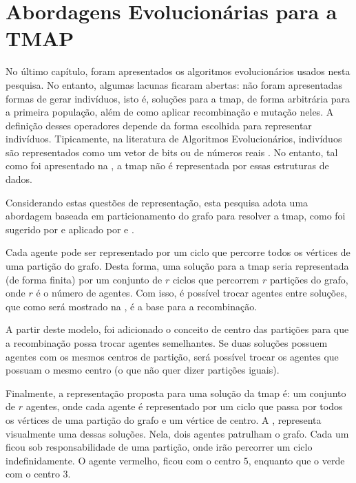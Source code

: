 \chapter{Abordagens Evolucionárias para a TMAP}
\label{chp:abordagens}

No último capítulo, foram apresentados os algoritmos evolucionários usados nesta 
pesquisa. No entanto, algumas lacunas ficaram abertas: não foram apresentadas 
formas de gerar indivíduos, isto é, soluções para a \ac{tmap}, de forma 
arbitrária para a primeira população, além de como aplicar 
recombinação e mutação neles. A definição desses operadores depende da forma 
escolhida para representar indivíduos. Tipicamente, na literatura de Algoritmos 
Evolucionários, indivíduos são representados como um vetor de bits ou de números 
reais \citep{Luke2013Metaheuristics}. No entanto, tal como foi apresentado na 
, a \ac{tmap} não é representada por essas estruturas de 
dados.

Considerando estas questões de representação, esta pesquisa adota uma abordagem 
baseada em particionamento do grafo para resolver a \ac{tmap}, como foi sugerido 
por \citep{Chevaleyre:2004:TAM:1018411.1019013} e aplicado por 
\citep{Pippin:2013:PBT:2480362.2480378} e \citep{4630897}.

Cada agente pode ser representado por um ciclo que percorre todos os vértices de 
uma partição do grafo. Desta forma, uma solução para a \ac{tmap} seria 
representada (de forma finita) por um conjunto de $r$ ciclos que percorrem $r$ 
partições do grafo, onde $r$ é o número de agentes. Com isso, é possível trocar 
agentes entre soluções, que como será mostrado na , é a 
base para a recombinação.

A partir deste modelo, foi adicionado o conceito de centro das partições para que 
a recombinação possa trocar agentes semelhantes. Se duas soluções possuem agentes 
com os mesmos centros de partição, será possível trocar os agentes que possuam o 
mesmo centro (o que não quer dizer partições iguais).

Finalmente, a representação proposta para uma solução da \ac{tmap} é: um conjunto 
de $r$ agentes, onde cada agente é representado por um ciclo que passa por todos 
os vértices de uma partição do grafo e um vértice de centro. A 
, representa visualmente uma dessas soluções. Nela, 
dois agentes patrulham o grafo. Cada um ficou sob responsabilidade de uma 
partição, onde irão percorrer um ciclo indefinidamente. O agente vermelho, 
ficou com o centro $5$, enquanto que o verde com o centro 3.

